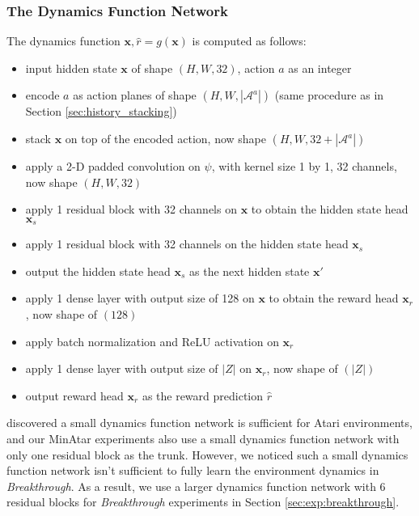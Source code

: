 \subsubsection{The Dynamics Function Network}
The dynamics function $\mathbf{x}, \hat{r} = g(\mathbf{x})$ is computed as follows:
\begin{itemize}
    \item input hidden state $\mathbf{x}$ of shape $(H, W, 32)$, action $a$ as an integer
    \item encode $a$ as action planes of shape $(H, W, |\mathcal{A}^a|)$ (same procedure as in Section \ref{sec:history_stacking})
    \item stack $\mathbf{x}$ on top of the encoded action, now shape $(H, W, 32 + |\mathcal{A}^a|)$

    \item apply a 2-D padded convolution on $\psi$, with kernel size 1 by 1, 32 channels, now shape $(H, W, 32)$
    \item apply 1 residual block with 32 channels on $\mathbf{x}$ to obtain the hidden state head $\mathbf{x}_s$
    \item apply 1 residual block with 32 channels on the hidden state head $\mathbf{x}_s$
    \item output the hidden state head $\mathbf{x}_s$ as the next hidden state $\mathbf{x}'$

    \item apply 1 dense layer with output size of 128 on $\mathbf{x}$ to obtain the reward head $\mathbf{x}_r$, now shape of $(128)$
    \item apply batch normalization and ReLU activation on $\mathbf{x}_r$
    \item apply 1 dense layer with output size of $|Z|$ on $\mathbf{x}_r$, now shape of $(|Z|)$
    \item output reward head $\mathbf{x}_r$ as the reward prediction $\hat{r}$
\end{itemize}
\citeauthor{MasteringAtariGames_Ye.Liu.ea_2021} discovered a small dynamics function network is sufficient for Atari environments, and our MinAtar experiments also use a small dynamics function network with only one residual block as the trunk.
However, we noticed such a small dynamics function network isn't sufficient to fully learn the environment dynamics in \textit{Breakthrough}.
As a result, we use a larger dynamics function network with 6 residual blocks for \textit{Breakthrough} experiments in Section \ref{sec:exp:breakthrough}.


